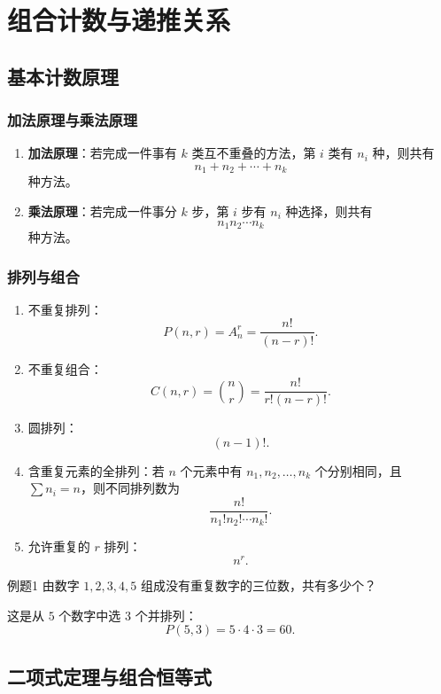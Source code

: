 \section{组合计数与递推关系}

\subsection{基本计数原理}

\subsubsection{加法原理与乘法原理}

\begin{enumerate}
	\item \textbf{加法原理}：若完成一件事有 \(k\) 类互不重叠的方法，第 \(i\) 类有 \(n_i\) 种，则共有
	\[
	n_1+n_2+\cdots+n_k
	\]
	种方法。
	\item \textbf{乘法原理}：若完成一件事分 \(k\) 步，第 \(i\) 步有 \(n_i\) 种选择，则共有
	\[
	n_1n_2\cdots n_k
	\]
	种方法。
\end{enumerate}

\subsubsection{排列与组合}

\begin{enumerate}
	\item 不重复排列：
	\[
	P(n,r)=A_n^r=\frac{n!}{(n-r)!}.
	\]
	\item 不重复组合：
	\[
	C(n,r)=\binom nr=\frac{n!}{r!(n-r)!}.
	\]
	\item 圆排列：
	\[
	(n-1)!.
	\]
	\item 含重复元素的全排列：若 \(n\) 个元素中有 \(n_1,n_2,\dots,n_k\) 个分别相同，且 \(\sum n_i=n\)，则不同排列数为
	\[
	\frac{n!}{n_1!n_2!\cdots n_k!}.
	\]
	\item 允许重复的 \(r\) 排列：
	\[
	n^r.
	\]
\end{enumerate}

\begin{question}{例题1}
	由数字 \(1,2,3,4,5\) 组成没有重复数字的三位数，共有多少个？
	
	\begin{solution}
	这是从 \(5\) 个数字中选 \(3\) 个并排列：
	\[
	P(5,3)=5\cdot4\cdot3=60.
	\]
	\end{solution}
\end{question}

\subsection{二项式定理与组合恒等式}

